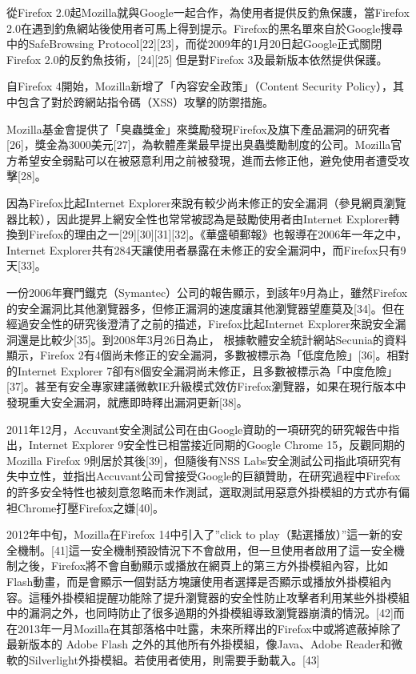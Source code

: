 \documentclass[12pt, a4paper, twoside]{article}
\begin{document}
從Firefox 2.0起Mozilla就與Google一起合作，為使用者提供反釣魚保護，當Firefox 2.0在遇到釣魚網站後使用者可馬上得到提示。Firefox的黑名單來自於Google搜尋中的SafeBrowsing Protocol[22][23]，而從2009年的1月20日起Google正式關閉Firefox 2.0的反釣魚技術，[24][25] 但是對Firefox 3及最新版本依然提供保護。

自Firefox 4開始，Mozilla新增了「內容安全政策」（Content Security Policy），其中包含了對於跨網站指令碼（XSS）攻擊的防禦措施。

Mozilla基金會提供了「臭蟲獎金」來獎勵發現Firefox及旗下產品漏洞的研究者[26]，獎金為3000美元[27]，為軟體產業最早提出臭蟲獎勵制度的公司。Mozilla官方希望安全弱點可以在被惡意利用之前被發現，進而去修正他，避免使用者遭受攻擊[28]。

因為Firefox比起Internet Explorer來說有較少尚未修正的安全漏洞（參見網頁瀏覽器比較），因此提昇上網安全性也常常被認為是鼓勵使用者由Internet Explorer轉換到Firefox的理由之一[29][30][31][32]。《華盛頓郵報》也報導在2006年一年之中，Internet Explorer共有284天讓使用者暴露在未修正的安全漏洞中，而Firefox只有9天[33]。

一份2006年賽門鐵克（Symantec）公司的報告顯示，到該年9月為止，雖然Firefox的安全漏洞比其他瀏覽器多，但修正漏洞的速度讓其他瀏覽器望塵莫及[34]。但在經過安全性的研究後澄清了之前的描述，Firefox比起Internet Explorer來說安全漏洞還是比較少[35]。到2008年3月26日為止， 根據軟體安全統計網站Secunia的資料顯示，Firefox 2有4個尚未修正的安全漏洞，多數被標示為「低度危險」[36]。相對的Internet Explorer 7卻有8個安全漏洞尚未修正，且多數被標示為「中度危險」[37]。甚至有安全專家建議微軟IE升級模式效仿Firefox瀏覽器，如果在現行版本中發現重大安全漏洞，就應即時釋出漏洞更新[38]。

2011年12月，Accuvant安全測試公司在由Google資助的一項研究的研究報告中指出，Internet Explorer 9安全性已相當接近同期的Google Chrome 15，反觀同期的Mozilla Firefox 9則居於其後[39]，但隨後有NSS Labs安全測試公司指此項研究有失中立性，並指出Accuvant公司曾接受Google的巨額贊助，在研究過程中Firefox的許多安全特性也被刻意忽略而未作測試，選取測試用惡意外掛模組的方式亦有偏袒Chrome打壓Firefox之嫌[40]。

2012年中旬，Mozilla在Firefox 14中引入了''click to play（點選播放）''這一新的安全機制。[41]這一安全機制預設情況下不會啟用，但一旦使用者啟用了這一安全機制之後，Firefox將不會自動顯示或播放在網頁上的第三方外掛模組內容，比如Flash動畫，而是會顯示一個對話方塊讓使用者選擇是否顯示或播放外掛模組內容。這種外掛模組提醒功能除了提升瀏覽器的安全性防止攻擊者利用某些外掛模組中的漏洞之外，也同時防止了很多過期的外掛模組導致瀏覽器崩潰的情況。[42]而在2013年一月Mozilla在其部落格中吐露，未來所釋出的Firefox中或將遮蔽掉除了最新版本的 Adobe Flash 之外的其他所有外掛模組，像Java、Adobe Reader和微軟的Silverlight外掛模組。若使用者使用，則需要手動載入。[43]
\end{document}
